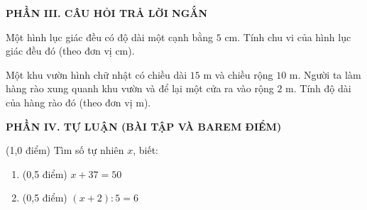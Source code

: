\documentclass[12pt,a4paper]{article}
\begin{document}
\setcounter{ex}{0}
\vspace{2mm}
\noindent\textbf{\large PHẦN III. CÂU HỎI TRẢ LỜI NGẮN}
\vspace{1mm}
\begin{ex}
Một hình lục giác đều có độ dài một cạnh bằng $5\text{ cm}$. Tính chu vi của hình lục giác đều đó (theo đơn vị $\text{cm}$). 
\end{ex}

\begin{ex}
Một khu vườn hình chữ nhật có chiều dài $15\text{ m}$ và chiều rộng $10\text{ m}$. Người ta làm hàng rào xung quanh khu vườn và để lại một cửa ra vào rộng $2\text{ m}$. Tính độ dài của hàng rào đó (theo đơn vị $\text{m}$). 
\end{ex}


\setcounter{ex}{0}
\vspace{2mm}
\noindent\textbf{\large PHẦN IV. TỰ LUẬN (BÀI TẬP VÀ BAREM ĐIỂM)}
\vspace{1mm}
\begin{ex} (1,0 điểm)
Tìm số tự nhiên $x$, biết:
\begin{enumerate}[label=\textbf{\alph*)}, leftmargin=0.8cm, itemsep=2pt]
\item (0,5 điểm) $x + 37 = 50$
\item (0,5 điểm) $(x + 2) : 5 = 6$
\end{enumerate}
\end{ex}
\vspace{2mm}
\end{document}
